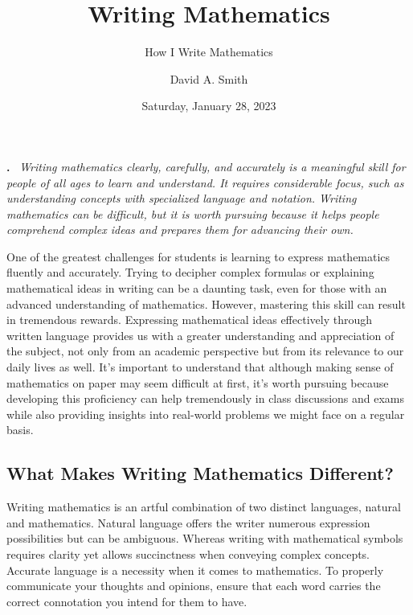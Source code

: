 \documentclass[
  twoside,
  12pt,
  letterpaper,
  fleqn]{article}
\title{Writing Mathematics}
\subtitle{How I Write Mathematics}
\author{David A. Smith}
\date{Saturday, January 28, 2023}
\renewenvironment{abstract}
{\par\noindent\textbf{\abstractname.}\ \ignorespaces \itshape}
{\par\medskip}
\begin{document}
\maketitle
\begin{abstract}
Writing mathematics clearly, carefully, and accurately is a meaningful
skill for people of all ages to learn and understand. It requires
considerable focus, such as understanding concepts with specialized
language and notation. Writing mathematics can be difficult, but it is
worth pursuing because it helps people comprehend complex ideas and
prepares them for advancing their own.
\end{abstract}
\ifdefined\Shaded\renewenvironment{Shaded}{\begin{tcolorbox}[interior hidden, frame hidden, enhanced, borderline west={3pt}{0pt}{shadecolor}, breakable, sharp corners, boxrule=0pt]}{\end{tcolorbox}}\fi

One of the greatest challenges for students is learning to express
mathematics fluently and accurately. Trying to decipher complex formulas
or explaining mathematical ideas in writing can be a daunting task, even
for those with an advanced understanding of mathematics. However,
mastering this skill can result in tremendous rewards. Expressing
mathematical ideas effectively through written language provides us with
a greater understanding and appreciation of the subject, not only from
an academic perspective but from its relevance to our daily lives as
well. It's important to understand that although making sense of
mathematics on paper may seem difficult at first, it's worth pursuing
because developing this proficiency can help tremendously in class
discussions and exams while also providing insights into real-world
problems we might face on a regular basis.

\hypertarget{what-makes-writing-mathematics-different}{%
\subsection{What Makes Writing Mathematics
Different?}\label{what-makes-writing-mathematics-different}}

Writing mathematics is an artful combination of two distinct languages,
natural and mathematics. Natural language offers the writer numerous
expression possibilities but can be ambiguous. Whereas writing with
mathematical symbols requires clarity yet allows succinctness when
conveying complex concepts. Accurate language is a necessity when it
comes to mathematics. To properly communicate your thoughts and
opinions, ensure that each word carries the correct connotation you
intend for them to have.
\end{document}

